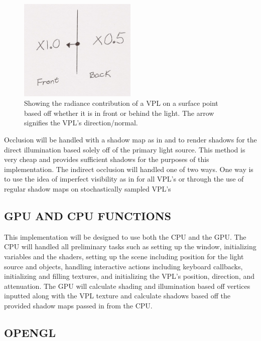 \begin{figure}[h!]
  \centering
    \includegraphics[width=0.5\textwidth]{Figure36.jpg}
  \caption{Showing the radiance contribution of a VPL on a surface point based off whether it is in front or behind the light.  The arrow signifies the VPL's direction/normal.}
	\label{fig:3.6}
\end{figure}

Occlusion will be handled with a shadow map as in \cite{Williams1978} and \cite{Reeves1987} to render shadows for the direct illumination based solely off of the primary light source.  This method is very cheap and provides sufficient shadows for the purposes of this implementation.  The indirect occlusion will handled one of two ways.  One way is to use the idea of imperfect visibility as in \cite{Ritschel2008} for all VPL's or through the use of regular shadow maps on stochastically sampled VPL's

\subsection{GPU AND CPU FUNCTIONS}

This implementation will be designed to use both the CPU and the GPU.  The CPU will handled all preliminary tasks such as setting up the window, initializing variables and the shaders, setting up the scene including position for the light source and objects, handling interactive actions including keyboard callbacks, initializing and filling textures, and initializing the VPL's position, direction, and attenuation.  The GPU will calculate shading and illumination based off vertices inputted along with the VPL texture and calculate shadows based off the provided shadow maps passed in from the CPU.

\subsection{OPENGL}

